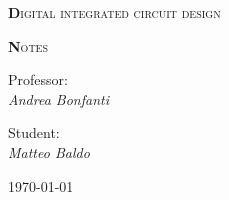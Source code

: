 \begin{titlepage}

	\centering
	{\scshape\huge\textbf Digital integrated circuit design \par}
	{\scshape\huge\textbf Notes \par}	
	\vspace{13cm}
{Professor:\\ \textit{Andrea Bonfanti}}	

\vspace{0.5cm}

{Student:\\ \textit{Matteo Baldo}}

\vspace{2cm}
	\vfill
	\raggedleft
	{\today\par}
	
\vspace{1cm}
\raggedright
\end{titlepage}
        \newpage
		\setcounter{page}{2}
        \null 
        \thispagestyle{empty} 
        \newpage  


\tableofcontents
